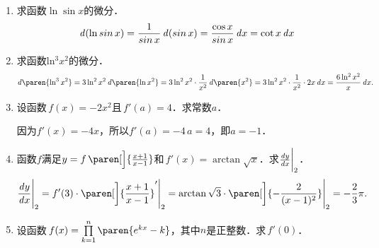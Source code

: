 \begin{enumerate}
\item 求函数\(\ln\sin x\)的微分．
  \ifshowsol
    \begin{equation*}
      \mathop{}\!\mathit{d}(\ln\operatorname{\smash{sin}} x)
      = \frac1{\operatorname{\smash{sin}} x} \mathop{}\!\mathit{d}(\operatorname{\smash{sin}} x)
      = \frac{\cos x}{\operatorname{\smash{sin}} x} \mathop{}\!\mathit{d} x
      = \cot x \mathop{}\!\mathit{d} x
    \end{equation*}
  \fi

\item 求函数\(\operatorname{ln^3} x^2\)的微分．
  \ifshowsol
    \begin{equation*}
      \diff\paren{\operatorname{ln^3} x^2}
      = 3\operatorname{ln^2} x^2 \diff\paren{\ln x^2}
      = 3\operatorname{ln^2} x^2 \cdot \frac1{x^2} \diff\paren{x^2}
      = 3\operatorname{ln^2} x^2 \cdot \frac1{x^2} \cdot 2x \dx
      = \frac{6 \operatorname{ln^2} x^2}{x} \dx.
    \end{equation*}
  \fi

\item 设函数\(\,f(x) = -2x^2\)且\(\,f'(a) = 4\)．求常数\(a\)．

  \ifshowsol
    因为\(f'(x) = -4x\)，所以\(f'(a) = -4\,a = 4\)，即\(a = -1\)．
  \fi

\item 函数\(f\)满足\(y = f\,\paren[\Big]{\frac{x+1}{x-1}} \)和\(\,f'(x) = \arctan\sqrt x\)．求\(\frac{\mathop{}\!\mathit{d} y}{\mathop{}\!\mathit{d} x}\bigg\vert_{2}\)．
  \ifshowsol
    \begin{equation*}
      \dydx\Bigg\vert_{2}
      = f'(3) \cdot \paren[\bigg]{\frac{x+1}{x-1}}'\Bigg\vert_{2}
      = \arctan\sqrt3 \cdot \paren[\bigg]{-\frac{2}{(x-1)^2}} \Bigg\vert_{2}
      = - \frac23 \pi.
    \end{equation*}
  \fi

\item 设函数\(\,f(x) = \prod\limits_{k=1}^n \paren{e^{kx}-k}\)，其中\(n\)是正整数．求\(\,f'(0)\)．


\end{enumerate}
